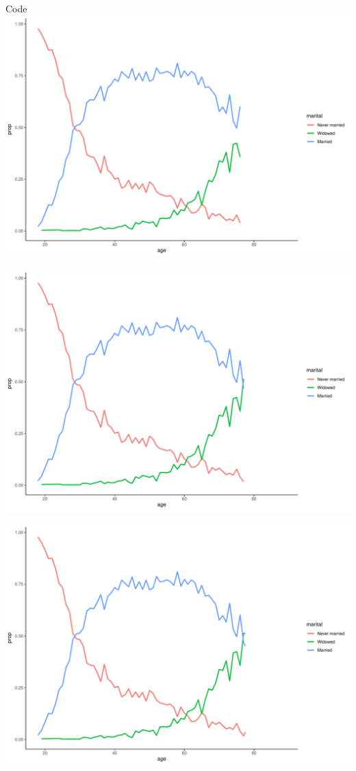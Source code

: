 \documentclass[
  ignorenonframetext,
]{beamer}
\begin{document}
\begin{frame}[fragile]{Code}
\includegraphics{gss_cat_files/figure-beamer/unnamed-chunk-1-86.pdf}

\includegraphics{gss_cat_files/figure-beamer/unnamed-chunk-1-87.pdf}

\includegraphics{gss_cat_files/figure-beamer/unnamed-chunk-1-88.pdf}


\end{frame}
\end{document}
